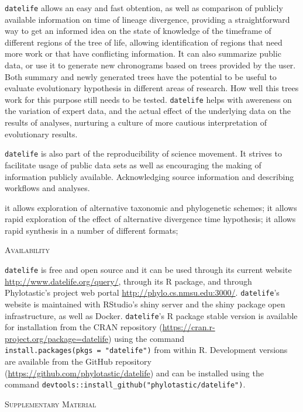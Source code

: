 \documentclass[]{article}
\begin{document}
\texttt{datelife} allows an easy and fast obtention, as well as comparison of publicly available information
on time of lineage divergence, providing a straightforward way to get an informed idea on the state of knowledge of the timeframe of different regions of the tree of life, allowing identification of regions that need more work or that have conflicting information.
It can also summarize public data, or use it to generate new chronograms based on trees provided by the user.
Both summary and newly generated trees have the potential to be useful to evaluate evolutionary hypothesis in different areas of research. How well this trees work for this purpose still needs to be tested. \texttt{datelife} helps with awereness on the variation of expert data, and the actual effect of the underlying data on the results of analyses, nurturing a culture of more cautious interpretation of evolutionary results.

\texttt{datelife} is also part of the reproducibility of science movement. It strives to facilitate usage of public data sets as well as encouraging the making of information publicly available. Acknowledging source information and describing workflows and analyses.

it allows exploration of alternative taxonomic and phylogenetic schemes;
it allows rapid exploration of the effect of alternative divergence time hypothesis;
it allows rapid synthesis in a number of different formats;

\begin{center}
\textsc{Availability}
\end{center}

\texttt{datelife} is free and open source and it can be used through its current website
\url{http://www.datelife.org/query/}, through its R package, and through Phylotastic's project web portal \url{http://phylo.cs.nmsu.edu:3000/}.
\texttt{datelife}'s website is maintained with RStudio's shiny server and the shiny package open infrastructure, as well as Docker.
\texttt{datelife}'s R package stable version is available
for installation from the CRAN repository (\url{https://cran.r-project.org/package=datelife})
using the command \texttt{install.packages(pkgs\ =\ "datelife")} from within R. Development versions
are available from the GitHub repository (\url{https://github.com/phylotastic/datelife})
and can be installed using the command \texttt{devtools::install\_github("phylotastic/datelife")}.

\begin{center}
\textsc{Supplementary Material}
\end{center}
\end{document}
